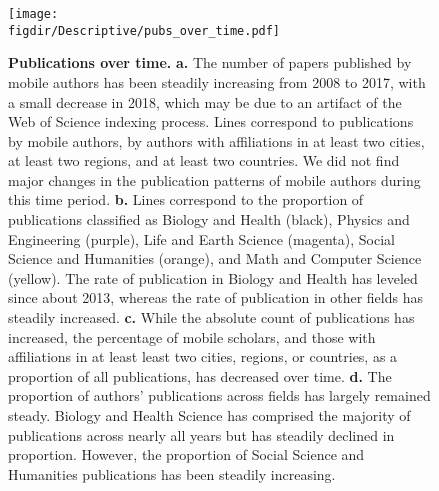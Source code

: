 \documentclass[12pt]{article} %
\def\figdir{../Figs}
\begin{document}
%
%
\begin{figure}[p!]
	\centering
	\texttt{[image: \\figdir/Descriptive/pubs\_over\_time.pdf]}
	\caption{
		\textbf{Publications over time.}
		\textbf{a.}
		The number of papers published by mobile authors has been steadily increasing from 2008 to 2017, with a small decrease in 2018,  which may be due to an artifact of the Web of Science indexing process.
		Lines correspond to publications by mobile authors, by authors with affiliations in at least two cities, at least two regions, and at least two countries.
		We did not find major changes in the publication patterns of mobile authors during this time period.
		\textbf{b.}
		Lines correspond to the proportion of publications classified as Biology and Health (black), Physics and Engineering (purple), Life and Earth Science (magenta), Social Science and Humanities (orange), and Math and Computer Science (yellow).
		The rate of publication in Biology and Health has leveled since about 2013, whereas the rate of publication in other fields has steadily increased.
		\textbf{c.}
		While the absolute count of publications has increased, the percentage of mobile scholars, and those with affiliations in at least least two cities, regions, or countries, as a proportion of all publications, has decreased over time.
		\textbf{d.}
		The proportion of authors' publications across fields has largely remained steady.
		Biology and Health Science has comprised the majority of publications across nearly all years but has steadily declined in proportion.
		However, the proportion of Social Science and Humanities publications has been steadily increasing.
	}
	\label{fig:supp:pubs_over_time}
\end{figure}
\end{document}
